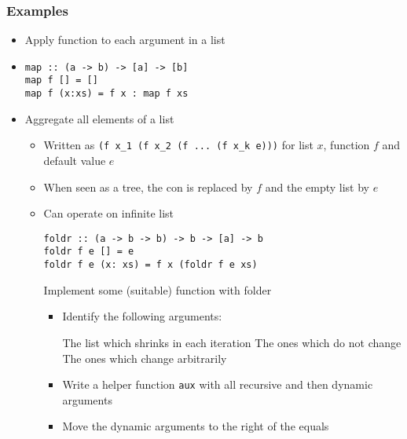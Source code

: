 \subsubsection{Examples}
\begin{itemize}
        \begin{itemize}
            \item Apply function to each argument in a list
            \item
\begin{verbatim}
map :: (a -> b) -> [a] -> [b]
map f [] = []
map f (x:xs) = f x : map f xs
\end{verbatim}
        \end{itemize}
        \begin{itemize}
            \item Aggregate all elements of a list
                \begin{itemize}
                    \item Written as \verb+(f x_1 (f x_2 (f ... (f x_k e)))+ for list $x$, function $f$ and default value $e$
                    \item When seen as a tree, the con is replaced by $f$ and the empty list by $e$
                    \item Can operate on infinite list
\begin{verbatim}
foldr :: (a -> b -> b) -> b -> [a] -> b
foldr f e [] = e
foldr f e (x: xs) = f x (foldr f e xs)
\end{verbatim}
                     Implement some (suitable) function with folder
                        \begin{itemize}
                            \item Identify the following arguments:
                                \begin{itemize}
                                     The list which shrinks in each iteration
                                     The ones which do not change
                                     The ones which change arbitrarily
                                \end{itemize}
                            \item Write a helper function \verb+aux+ with all recursive and then dynamic arguments
                            \item Move the dynamic arguments to the right of the equals

\end{itemize}
\end{itemize}
\end{itemize}
\end{itemize}
